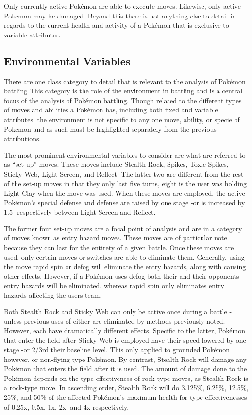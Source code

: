 \documentclass[12pt,twoside]{reedthesis}
\begin{document}
  Only currently active Pokémon are able to execute moves. Likewise, only
  active Pokémon may be damaged. Beyond this there is not anything else to
  detail in regards to the current health and activity of a Pokémon that
  is exclusive to variable attributes.
  
  \subsection{Environmental Variables}\label{environmental-variables}
  
  There are one class category to detail that is relevant to the analysis
  of Pokémon battling This category is the role of the environment in
  battling and is a central focus of the analysis of Pokémon battling.
  Though related to the different types of moves and abilities a Pokémon
  has, including both fixed and variable attributes, the environment is
  not specific to any one move, ability, or specie of Pokémon and as such
  must be highlighted separately from the previous attributions.
  
  The most prominent environmental variables to consider are what are
  referred to as ``set-up'' moves. These moves include Stealth Rock,
  Spikes, Toxic Spikes, Sticky Web, Light Screen, and Reflect. The latter
  two are different from the rest of the set-up moves in that they only
  last five turns, eight is the user was holding Light Clay when the move
  was used. When these moves are employed, the active Pokémon's special
  defense and defense are raised by one stage -or is increased by 1.5-
  respectively between Light Screen and Reflect.
  
  The former four set-up moves are a focal point of analysis and are in a
  category of moves known as entry hazard moves. These moves are of
  particular note because they can last for the entirety of a given
  battle. Once these moves are used, only certain moves or switches are
  able to eliminate them. Generally, using the move rapid spin or defog
  will eliminate the entry hazards, along with causing other effects.
  However, if a Pokémon uses defog both their and their opponents entry
  hazards will be eliminated, whereas rapid spin only eliminates entry
  hazards affecting the users team.
  
  Both Stealth Rock and Sticky Web can only be active once during a battle
  -unless previous uses of either are eliminated by methods previously
  noted. However, each have dramatically different effects. Specific to
  the latter, Pokémon that enter the field after Sticky Web is employed
  have their speed lowered by one stage -or 2/3rd their baseline level.
  This only applied to grounded Pokémon however, or non-flying type
  Pokémon. By contrast, Stealth Rock will damage any Pokémon that enters
  the field after it is used. The amount of damage done to the Pokémon
  depends on the type effectiveness of rock-type moves, as Stealth Rock is
  a rock-type move. In ascending order, Stealth Rock will do 3.125\%,
  6.25\%, 12.5\%, 25\%, and 50\% of the affected Pokémon's maximum health
  for type effectivenesses of 0.25x, 0.5x, 1x, 2x, and 4x respectively.
  
\end{document}

